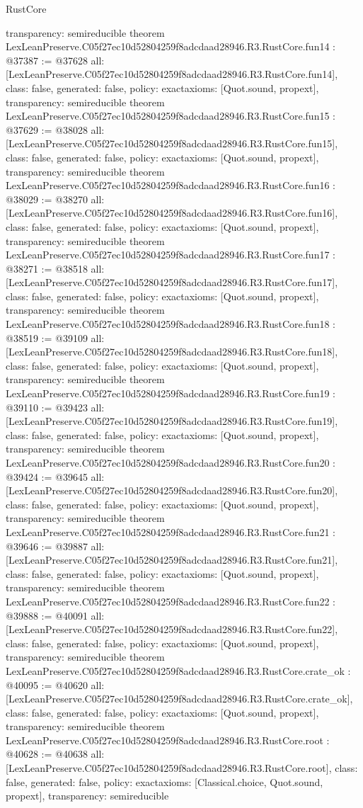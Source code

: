\begin{lexlean}{RustCore}
\begin{coremodule}
{  transparency: semireducible
}
theorem LexLeanPreserve.C05f27ec10d52804259f8adcdaad28946.R3.RustCore.fun14 : @37387 := @37628 {
  all: [LexLeanPreserve.C05f27ec10d52804259f8adcdaad28946.R3.RustCore.fun14],
  class: false,
  generated: false,
  policy: exact{axioms: [Quot.sound, propext]},
  transparency: semireducible
}
theorem LexLeanPreserve.C05f27ec10d52804259f8adcdaad28946.R3.RustCore.fun15 : @37629 := @38028 {
  all: [LexLeanPreserve.C05f27ec10d52804259f8adcdaad28946.R3.RustCore.fun15],
  class: false,
  generated: false,
  policy: exact{axioms: [Quot.sound, propext]},
  transparency: semireducible
}
theorem LexLeanPreserve.C05f27ec10d52804259f8adcdaad28946.R3.RustCore.fun16 : @38029 := @38270 {
  all: [LexLeanPreserve.C05f27ec10d52804259f8adcdaad28946.R3.RustCore.fun16],
  class: false,
  generated: false,
  policy: exact{axioms: [Quot.sound, propext]},
  transparency: semireducible
}
theorem LexLeanPreserve.C05f27ec10d52804259f8adcdaad28946.R3.RustCore.fun17 : @38271 := @38518 {
  all: [LexLeanPreserve.C05f27ec10d52804259f8adcdaad28946.R3.RustCore.fun17],
  class: false,
  generated: false,
  policy: exact{axioms: [Quot.sound, propext]},
  transparency: semireducible
}
theorem LexLeanPreserve.C05f27ec10d52804259f8adcdaad28946.R3.RustCore.fun18 : @38519 := @39109 {
  all: [LexLeanPreserve.C05f27ec10d52804259f8adcdaad28946.R3.RustCore.fun18],
  class: false,
  generated: false,
  policy: exact{axioms: [Quot.sound, propext]},
  transparency: semireducible
}
theorem LexLeanPreserve.C05f27ec10d52804259f8adcdaad28946.R3.RustCore.fun19 : @39110 := @39423 {
  all: [LexLeanPreserve.C05f27ec10d52804259f8adcdaad28946.R3.RustCore.fun19],
  class: false,
  generated: false,
  policy: exact{axioms: [Quot.sound, propext]},
  transparency: semireducible
}
theorem LexLeanPreserve.C05f27ec10d52804259f8adcdaad28946.R3.RustCore.fun20 : @39424 := @39645 {
  all: [LexLeanPreserve.C05f27ec10d52804259f8adcdaad28946.R3.RustCore.fun20],
  class: false,
  generated: false,
  policy: exact{axioms: [Quot.sound, propext]},
  transparency: semireducible
}
theorem LexLeanPreserve.C05f27ec10d52804259f8adcdaad28946.R3.RustCore.fun21 : @39646 := @39887 {
  all: [LexLeanPreserve.C05f27ec10d52804259f8adcdaad28946.R3.RustCore.fun21],
  class: false,
  generated: false,
  policy: exact{axioms: [Quot.sound, propext]},
  transparency: semireducible
}
theorem LexLeanPreserve.C05f27ec10d52804259f8adcdaad28946.R3.RustCore.fun22 : @39888 := @40091 {
  all: [LexLeanPreserve.C05f27ec10d52804259f8adcdaad28946.R3.RustCore.fun22],
  class: false,
  generated: false,
  policy: exact{axioms: [Quot.sound, propext]},
  transparency: semireducible
}
theorem LexLeanPreserve.C05f27ec10d52804259f8adcdaad28946.R3.RustCore.crate_ok : @40095 := @40620 {
  all: [LexLeanPreserve.C05f27ec10d52804259f8adcdaad28946.R3.RustCore.crate_ok],
  class: false,
  generated: false,
  policy: exact{axioms: [Quot.sound, propext]},
  transparency: semireducible
}
theorem LexLeanPreserve.C05f27ec10d52804259f8adcdaad28946.R3.RustCore.root : @40628 := @40638 {
  all: [LexLeanPreserve.C05f27ec10d52804259f8adcdaad28946.R3.RustCore.root],
  class: false,
  generated: false,
  policy: exact{axioms: [Classical.choice, Quot.sound, propext]},
  transparency: semireducible
}


\end{coremodule}
\end{lexlean}
